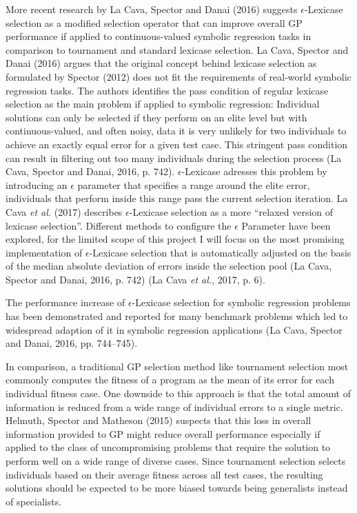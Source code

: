 \documentclass[
  12pt,
]{article}
\begin{document}
More recent research by La Cava, Spector and Danai (2016) suggests
\(\epsilon\)-Lexicase selection as a modified selection operator that
can improve overall GP performance if applied to continuous-valued
symbolic regression tasks in comparison to tournament and standard
lexicase selection. La Cava, Spector and Danai (2016) argues that the
original concept behind lexicase selection as formulated by Spector
(2012) does not fit the requirements of real-world symbolic regression
tasks. The authors identifies the pass condition of regular lexicase
selection as the main problem if applied to symbolic regression:
Individual solutions can only be selected if they perform on an elite
level but with continuous-valued, and often noisy, data it is very
unlikely for two individuals to achieve an exactly equal error for a
given test case. This stringent pass condition can result in filtering
out too many individuals during the selection process (La Cava, Spector
and Danai, 2016, p. 742). \(\epsilon\)-Lexicase adresses this problem by
introducing an \(\epsilon\) parameter that specifies a range around the
elite error, individuals that perform inside this range pass the current
selection iteration. La Cava \emph{et al.} (2017) describes
\(\epsilon\)-Lexicase selection as a more ``relaxed version of lexicase
selection''. Different methods to configure the \(\epsilon\) Parameter
have been explored, for the limited scope of this project I will focus
on the most promising implementation of \(\epsilon\)-Lexicase selection
that is automatically adjusted on the basis of the median absolute
deviation of errors inside the selection pool (La Cava, Spector and
Danai, 2016, p. 742) (La Cava \emph{et al.}, 2017, p. 6).

The performance increase of \(\epsilon\)-Lexicase selection for symbolic
regression problems has been demonstrated and reported for many
benchmark problems which led to widespread adaption of it in symbolic
regression applications (La Cava, Spector and Danai, 2016, pp.
744--745).

In comparison, a traditional GP selection method like tournament
selection most commonly computes the fitness of a program as the mean of
its error for each individual fitness case. One downside to this
approach is that the total amount of information is reduced from a wide
range of individual errors to a single metric. Helmuth, Spector and
Matheson (2015) suspects that this loss in overall information provided
to GP might reduce overall performance especially if applied to the
class of uncompromising problems that require the solution to perform
well on a wide range of diverse cases. Since tournament selection
selects individuals based on their average fitness across all test
cases, the resulting solutions should be expected to be more biased
towards being generalists instead of specialists.
\end{document}
